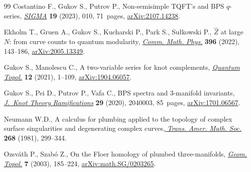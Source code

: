 \documentclass[11pt]{article}
\numberwithin{equation}{section}
\numberwithin{equation}{section}
\begin{document}
\begin{thebibliography}{99}
Costantino F., Gukov S., Putrov P., Non-semisimple {TQFT}'s and {BPS}
 {$q$}-series, \href{https://doi.org/10.3842/SIGMA.2023.010}{\textit{SIGMA}} \textbf{19} (2023), 010, 71~pages, \href{https://arxiv.org/abs/2107.14238}{arXiv:2107.14238}.

Ekholm T., Gruen A., Gukov S., Kucharski P., Park S., Su{\l}kowski P.,
 {$\widehat{Z}$} at large {$N$}: from curve counts to quantum modularity,
 \href{https://doi.org/10.1007/s00220-022-04469-9}{\textit{Comm. Math. Phys.}} \textbf{396} (2022), 143--186,
 \href{https://arxiv.org/abs/2005.13349}{arXiv:2005.13349}.

Gukov S., Manolescu C., A two-variable series for knot complements,
 \href{https://doi.org/10.4171/qt/145}{\textit{Quantum Topol.}} \textbf{12} (2021), 1--109, \href{https://arxiv.org/abs/1904.06057}{arXiv:1904.06057}.

Gukov S., Pei D., Putrov P., Vafa C., B{PS} spectra and 3-manifold invariants,
 \href{https://doi.org/10.1142/S0218216520400039}{\textit{J.~Knot Theory Ramifications}} \textbf{29} (2020), 2040003, 85~pages,
 \href{https://arxiv.org/abs/1701.06567}{arXiv:1701.06567}.

Neumann W.D., A calculus for plumbing applied to the topology of complex
 surface singularities and degenerating complex curves,\href{https://doi.org/10.2307/1999331}{ \textit{Trans. Amer.
 Math. Soc.}} \textbf{268} (1981), 299--344.

Ozsv\'ath P., Szab\'o Z., On the {F}loer homology of plumbed three-manifolds,
 \href{https://doi.org/10.2140/gt.2003.7.185}{\textit{Geom. Topol.}} \textbf{7} (2003), 185--224, \href{https://arxiv.org/abs/math.SG/0203265}{arXiv:math.SG/0203265}.

\end{thebibliography}
\end{document}

